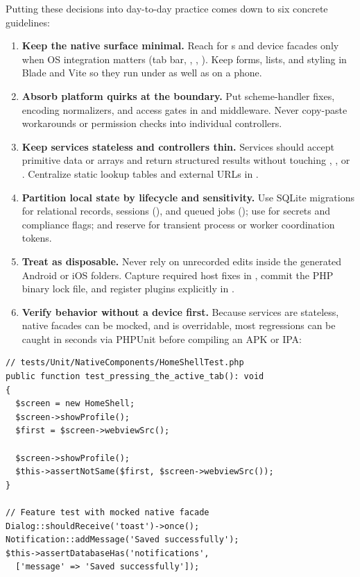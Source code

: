 Putting these decisions into day-to-day practice comes down to six concrete guidelines:

\begin{enumerate}
  \item \textbf{Keep the native surface minimal.} Reach for s and device
  facades only when OS integration matters (tab bar, ,
  , ). Keep forms, lists, and styling in Blade and Vite
  so they run under  as well as on a phone.

  \item \textbf{Absorb platform quirks at the boundary.} Put scheme-handler fixes, encoding
  normalizers, and access gates in  and middleware. Never copy-paste
   workarounds or permission checks into individual controllers.

  \item \textbf{Keep services stateless and controllers thin.} Services should accept primitive
  data or arrays and return structured results without touching , , or
  . Centralize static lookup tables and external URLs in .

  \item \textbf{Partition local state by lifecycle and sensitivity.} Use SQLite migrations for
  relational records, sessions (), and queued jobs
  (); use  for secrets and compliance flags; and
  reserve  for transient process or worker coordination tokens.

  \item \textbf{Treat  as disposable.} Never rely on unrecorded edits inside the
  generated Android or iOS folders. Capture required host fixes in , commit the
  PHP binary lock file, and register plugins explicitly in .

  \item \textbf{Verify behavior without a device first.} Because services are stateless, native
  facades can be mocked, and  is overridable, most regressions
  can be caught in seconds via PHPUnit before compiling an APK or IPA:
\end{enumerate}

\begin{lstlisting}[language=php8]
// tests/Unit/NativeComponents/HomeShellTest.php
public function test_pressing_the_active_tab(): void
{
  $screen = new HomeShell;
  $screen->showProfile();
  $first = $screen->webviewSrc();

  $screen->showProfile();
  $this->assertNotSame($first, $screen->webviewSrc());
}

// Feature test with mocked native facade
Dialog::shouldReceive('toast')->once();
Notification::addMessage('Saved successfully');
$this->assertDatabaseHas('notifications',
  ['message' => 'Saved successfully']);
\end{lstlisting}


